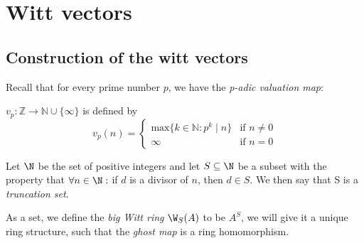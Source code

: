 \chapter{Witt vectors}
\section*{Construction of the witt vectors}

Recall that for every prime number $p$, we have the \textit{p-adic valuation map}:
\begin{definition}
   $v_p \colon \mathbb{Z} \to \mathbb{N} \cup\{\infty\}$
    is defined by 
    \[
        v_p(n)=
        \begin{cases}
        \mathrm{max}\{k \in \mathbb{N} : p^k \mid n\} & \text{if } n \neq 0\\
        \infty & \text{if } n=0
        \end{cases} 
    \]

\end{definition}

\begin{definition}
    Let $\N$ be the set of positive integers and let $S\subseteq
    \N$ be a subset with the property that $\forall n\in \N:$
    if $d$ is a divisor of $n$, then $d\in S$.
    We then say that S is a \textit{truncation set}.
\end{definition}
As a set, we define the \textit{big Witt ring} $\W_S(A)$ to be $A^S$,
we will give it a unique ring structure, such that the \textit{ghost map}
is a ring homomorphism.

